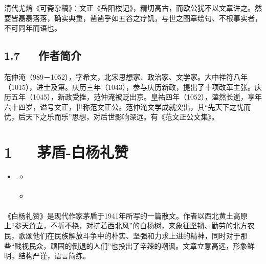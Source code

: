 \documentclass[letterpaper,12pt,english]{sphinxmanual}
\begin{document}
清代尤焴《可斋杂稿》：文正《岳阳楼记》，精切高古，而欧公犹不以文章许之。然要皆磊磊落落，确实典重，凿凿乎如五谷之疗饥，与世之图章绘句、不根事实者，不可同年而语也。


\section{1.7   作者简介}
\label{\detokenize{p01_u6563_u6587/_u8303_u4ef2_u6df9-_u5cb3_u9633_u697c_u8bb0:id9}}
范仲淹（989－1052），字希文，北宋思想家、政治家、文学家。大中祥符八年（1015），进士及第。庆历三年（1043），参与庆历新政，提出了十项改革主张。庆历五年（1045），新政受挫，范仲淹被贬出京。皇祐四年（1052），溘然长逝，享年六十四岁，谥号文正，世称范文正公。范仲淹文学成就突出，其“先天下之忧而忧，后天下之乐而乐”思想，对后世影响深远。有《范文正公文集》。


\chapter{1   茅盾-白杨礼赞}
\label{\detokenize{p01_u6563_u6587/_u8305_u76fe-_u767d_u6768_u793c_u8d5e:id1}}\label{\detokenize{p01_u6563_u6587/_u8305_u76fe-_u767d_u6768_u793c_u8d5e::doc}}
\begin{sphinxShadowBox}
\begin{itemize}
\item {} 
\label{\detokenize{p01_u6563_u6587/_u8305_u76fe-_u767d_u6768_u793c_u8d5e:id5}}{\hyperref[\detokenize{p01_u6563_u6587/_u8305_u76fe-_u767d_u6768_u793c_u8d5e:id1}]{}}
\begin{itemize}
\item {} 
\label{\detokenize{p01_u6563_u6587/_u8305_u76fe-_u767d_u6768_u793c_u8d5e:id6}}{\hyperref[\detokenize{p01_u6563_u6587/_u8305_u76fe-_u767d_u6768_u793c_u8d5e:id3}]{}}

\item {} 
\label{\detokenize{p01_u6563_u6587/_u8305_u76fe-_u767d_u6768_u793c_u8d5e:id7}}{\hyperref[\detokenize{p01_u6563_u6587/_u8305_u76fe-_u767d_u6768_u793c_u8d5e:id4}]{}}

\end{itemize}

\end{itemize}
\end{sphinxShadowBox}

《白杨礼赞》是现代作家茅盾于1941年所写的一篇散文。作者以西北黄土高原上“参天耸立，不折不挠，对抗着西北风”的白杨树，来象征坚韧、勤劳的北方农民，歌颂他们在民族解放斗争中的朴实、坚强和力求上进的精神，同时对于那些“贱视民众，顽固的倒退的人们”也投出了辛辣的嘲讽。文章立意高远，形象鲜明，结构严谨，语言简练。
\end{document}
